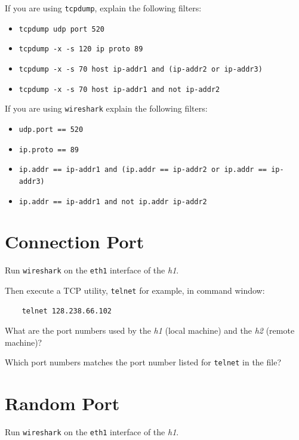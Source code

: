 \documentclass{UTNetLab}
\begin{document}
If you are using \lstinline{tcpdump}, explain the following filters:
\begin{itemize}
    \item \lstinline{tcpdump udp port 520}
    \item \lstinline{tcpdump -x -s 120 ip proto 89}
    \item \lstinline[emph={ip-addr1, ip-addr2, ip-addr3}]{tcpdump -x -s 70 host ip-addr1 and (ip-addr2 or ip-addr3)}
    \item \lstinline[emph={ip-addr1, ip-addr2}]{tcpdump -x -s 70 host ip-addr1 and not ip-addr2}
\end{itemize}

If you are using \lstinline{wireshark} explain the following filters:
\begin{itemize}
    \item \lstinline{udp.port == 520}
    \item \lstinline{ip.proto == 89}
    \item \lstinline[emph={ip-addr1, ip-addr2, ip-addr3}]{ip.addr == ip-addr1 and (ip.addr == ip-addr2 or ip.addr == ip-addr3)}
    \item \lstinline[emph={ip-addr1, ip-addr2}]{ip.addr == ip-addr1 and not ip.addr ip-addr2}
\end{itemize}

\section{Connection Port}
Run \lstinline{wireshark} on the \texttt{eth1} interface of the \textit{h1}.

Then execute a TCP utility, \lstinline{telnet} for example, in command window:

\begin{lstlisting}
	telnet 128.238.66.102
\end{lstlisting}


\begin{report}
    \item What are the port numbers used by the \textit{h1} (local machine) and the \textit{h2} (remote machine)?

    \item Which port numbers matches the port number listed for \lstinline{telnet} in the  file?
\end{report}


\section{Random Port}
Run \lstinline{wireshark} on the \texttt{eth1} interface of the \textit{h1}.
\end{document}
